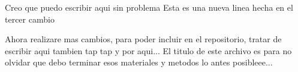 Creo que puedo escribir aqui sin problema
Esta es una nueva linea hecha en el tercer cambio

Ahora realizare mas cambios, para poder incluir en el repositorio, tratar de escribir aqui tambien
tap
tap
y por aqui...
El titulo de este archivo es para no olvidar que debo terminar esos materiales y metodos lo antes posibleee...

